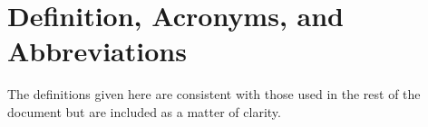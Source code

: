 % 
% 
% 

% 

\section{Definition, Acronyms, and Abbreviations}
\label{sec:reqdefs}
The definitions given here are consistent with those used in the rest of the document but are included as a matter of clarity.

